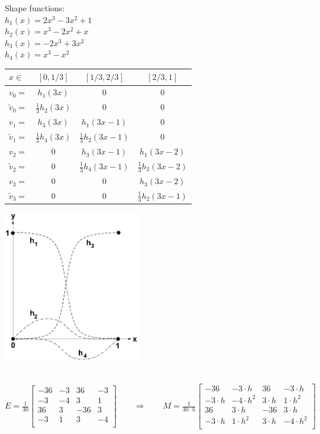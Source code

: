 \begin{minipage}{4cm}
Shape functions:\\
$h_1(x)=2x^3-3x^2+1$\\
$h_2(x)=x^3-2x^2+x$\\
$h_3(x)=-2x^3+3x^2$\\
$h_4(x)=x^3-x^2$
\end{minipage}
\hfill
\begin{minipage}{8cm}
	\begin{tabular}{lc|c|c}
		$x\in$&$[0,1/3]$&$[1/3,2/3]$&$[2/3,1]$\\
		\hline
		$v_0=$&$h_1(3x)$&$0$&$0$\\
		$\tilde{v}_0=$&$\frac 13 h_2(3x)$&$0$&$0$\\
		$v_1=$&$h_3(3x)$&$h_1(3x-1)$&$0$\\
		$\tilde{v}_1=$&$\frac 13 h_4(3x)$&$\frac 13 h_2(3x-1)$&$0$\\
		$v_2=$&$0$&$h_3(3x-1)$&$h_1(3x-2)$\\
		$\tilde{v}_2=$&$0$&$\frac 13 h_4(3x-1)$&$\frac 13 h_2(3x-2)$\\
		$v_3=$&$0$&$0$&$h_3(3x-2)$\\
		$\tilde{v}_3=$&$0$&$0$&$\frac 13 h_2(3x-1)$\\
	\end{tabular}
\end{minipage}
\hfill
\begin{minipage}{6cm}
\includegraphics[width=6cm]{Content/02_numerics/FEM3Ord}
\end{minipage}\\
$E=\frac{1}{30}
\begin{bmatrix}
	-36 & -3 & 36 & -3\\
	-3 & -4 & 3 & 1\\
	36 & 3 & -36 & 3\\
	-3 & 1 & 3 & -4\\
\end{bmatrix}\qquad\Rightarrow\qquad
\boxed{M=\frac{1}{30\cdot h}
\begin{bmatrix}
	-36 & -3\cdot h & 36 & -3\cdot h\\
	-3\cdot h & -4\cdot h^2 & 3\cdot h & 1\cdot h^2\\
	36 & 3\cdot h & -36 & 3\cdot h\\
	-3\cdot h & 1\cdot h^2 & 3\cdot h & -4\cdot h^2\\
\end{bmatrix}}$\\
\\


